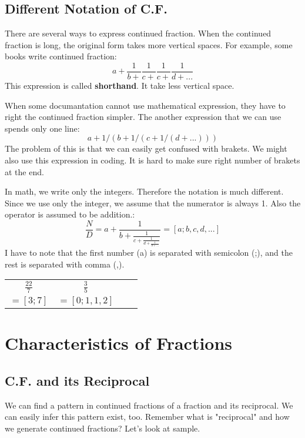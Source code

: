 \documentclass{jreport}
\begin{document}
\pagebreak

\section*{Different Notation of C.F.}
There are several ways to express continued fraction. When the continued fraction is long, the original form takes more vertical spaces. For example, some books write continued fraction:
\[a+\frac{1}{b+}\frac{1}{c+}\frac{1}{c+}\frac{1}{d+...}\]
This expression is called \textbf{shorthand}. It take less vertical space.

When some documantation cannot use mathematical expression, they have to right the continued fraction simpler. The another expression that we can use spends only one line:
\[a+1/(b+1/(c+1/(d+...)))\]
The problem of this is that we can easily get confused with brakets. We might also use this expression in coding. It is hard to make sure right number of brakets at the end.

In math, we write only the integers. Therefore the notation is much different. Since we use only the integer, we assume that the numerator is always 1. Also the operator is assumed to be addition.:
\[\frac{N}{D}=a+\frac{1}{b+\frac{1}{c+\frac{1}{d+\frac{1}{d+...}}}}=[a;b,c,d,...]\]
I have to note that the first number (a) is separated with semicolon (;), and the rest is separated with comma (,).
\begin{table}[htbp]
\begin{center}
\begin{tabular}{|c|c|c|c|}
\hline
$\frac{22}{7}$ & $\frac{3}{5}$\\
$=[3;7]$ & $=[0;1,1,2]$\\
\hline
\end{tabular}
\end{center}
\end{table}

\pagebreak

\chapter*{Characteristics of Fractions}

\section*{C.F. and its Reciprocal}
We can find a pattern in continued fractions of a fraction and its reciprocal. We can easily infer this pattern exist, too. Remember what is "reciprocal" and how we generate continued fractions? Let's look at sample.
\end{document}
